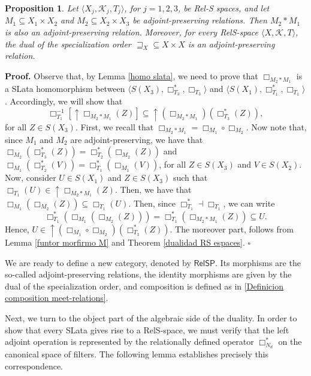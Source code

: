 \documentclass{article}
\newtheorem{proposition}{\bf Proposition}[section]
\newenvironment{proof}
{\par\noindent\textbf{Proof. }\rm}
{\hfill$\boldsymbol{\square}$\par\vspace{0.3cm}}
\begin{document}
\begin{proposition}\label{composition adjoint-preserving}
    Let $\langle X_j, \mathcal{K}_j, T_j\rangle$, for $j = 1, 2, 3$, be Rel-S spaces, and let $M_1 \subseteq X_1 \times X_2$ and $M_2 \subseteq X_2 \times X_3$ be adjoint-preserving relations. Then $M_2 * M_1$ is also an adjoint-preserving relation. Moreover, for every RelS-space $\langle X, \mathcal{K}, T \rangle$, the dual of the specialization order $\sqsupseteq_X \subseteq X \times X$ is an adjoint-preserving relation.
\end{proposition}
\begin{proof}
Observe that, by Lemma \ref{homo slata}, we need to prove that $\Box_{M_2 * M_1}$ is a SLata homomorphism between $\langle S(X_3), \Box_{T_3}^{*},\Box_{T_3}\rangle$ and $\langle S(X_1), \Box_{T_1}^{*},\Box_{T_1}\rangle$. Accordingly, we will show that 
\[
\Box_{T_1}^{-1}[\uparrow \Box_{M_2 * M_1}(Z)]\subseteq \uparrow (\Box_{M_2 * M_1})(\Box_{T_3}^{*}(Z)),
\] 
for all $Z \in S(X_3)$. First, we recall that $\Box_{M_2 * M_1}=\Box_{M_1}\circ\Box_{M_2}$. Now note that, since $M_1$ and $M_2$ are adjoint-preserving, we have that $\Box_{M_2}(\Box_{T_3}^{*}(Z))=\Box_{T_2}^{*}(\Box_{M_2}(Z))$ and $\Box_{M_1}(\Box_{T_2}^{*}(V))=\Box_{T_1}^{*}(\Box_{M_1}(V))$, for all $Z\in S(X_3)$ and $V\in S(X_2)$. Now, consider $U \in S(X_1)$ and $Z \in S(X_3)$ such that $\Box_{T_1}(U) \in \uparrow \Box_{M_2 * M_1}(Z)$. Then, we have that $\Box_{M_1}(\Box_{M_2}(Z))\subseteq \Box_{T_1}(U)$. Then, since $\Box_{T_1}^{*}\dashv \Box_{T_1}$, we can write 
\[
\Box_{T_1}^{*}(\Box_{M_1}(\Box_{M_2}(Z)))=\Box_{T_1}^{*}(\Box_{M_2 * M_1}(Z)) \subseteq U.
\]
Hence, $U \in \uparrow (\Box_{M_1}\circ \Box_{M_2})(\Box_{T_3}^{*}(Z))$. The moreover part, follows from Lemma \ref{funtor morfirmo M} and Theorem \ref{dualidad RS espaces}.
\end{proof}


We are ready to define a new category, denoted by $\mathsf{RelSP}$. Its morphisms are the so-called adjoint-preserving relations, the identity morphisms are given by the dual of the specialization order, and composition is defined as in \eqref{Definicion composition meet-relations}.
\medskip

Next, we turn to the object part of the algebraic side of the duality. In order to show that every SLata gives rise to a RelS-space, we must verify that the left adjoint operation is represented by the relationally defined operator $\Box_{N_d}^{*}$ on the canonical space of filters. The following lemma establishes precisely this correspondence.
\end{document}
